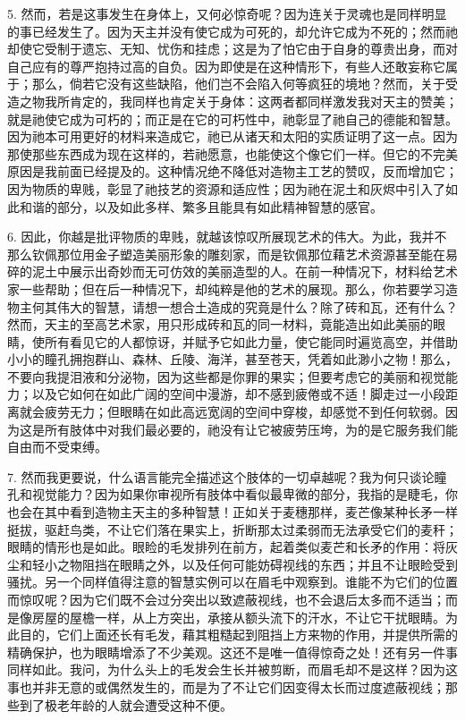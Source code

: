 5. 然而，若是这事发生在身体上，又何必惊奇呢？因为连关于灵魂也是同样明显的事已经发生了。因为天主并没有使它成为可死的，却允许它成为不死的；然而祂却使它受制于遗忘、无知、忧伤和挂虑；这是为了怕它由于自身的尊贵出身，而对自己应有的尊严抱持过高的自负。因为即使是在这种情形下，有些人还敢妄称它属于；那么，倘若它没有这些缺陷，他们岂不会陷入何等疯狂的境地？然而，关于受造之物我所肯定的，我同样也肯定关于身体：这两者都同样激发我对天主的赞美；就是祂使它成为可朽的；而正是在它的可朽性中，祂彰显了祂自己的德能和智慧。因为祂本可用更好的材料来造成它，祂已从诸天和太阳的实质证明了这一点。因为那使那些东西成为现在这样的，若祂愿意，也能使这个像它们一样。但它的不完美原因是我前面已经提及的。这种情况绝不降低对造物主工艺的赞叹，反而增加它；因为物质的卑贱，彰显了祂技艺的资源和适应性；因为祂在泥土和灰烬中引入了如此和谐的部分，以及如此多样、繁多且能具有如此精神智慧的感官。\par

6. 因此，你越是批评物质的卑贱，就越该惊叹所展现艺术的伟大。为此，我并不那么钦佩那位用金子塑造美丽形象的雕刻家，而是钦佩那位藉艺术资源甚至能在易碎的泥土中展示出奇妙而无可仿效的美丽造型的人。在前一种情况下，材料给艺术家一些帮助；但在后一种情况下，却纯粹是他的艺术的展现。那么，你若要学习造物主何其伟大的智慧，请想一想合土造成的究竟是什么？除了砖和瓦，还有什么？然而，天主的至高艺术家，用只形成砖和瓦的同一材料，竟能造出如此美丽的眼睛，使所有看见它的人都惊讶，并赋予它如此力量，使它能同时遍览高空，并借助小小的瞳孔拥抱群山、森林、丘陵、海洋，甚至苍天，凭着如此渺小之物！那么，不要向我提泪液和分泌物，因为这些都是你罪的果实；但要考虑它的美丽和视觉能力；以及它如何在如此广阔的空间中漫游，却不感到疲倦或不适！脚走过一小段距离就会疲劳无力；但眼睛在如此高远宽阔的空间中穿梭，却感觉不到任何软弱。因为这是所有肢体中对我们最必要的，祂没有让它被疲劳压垮，为的是它服务我们能自由而不受束缚。\par

7. 然而我更要说，什么语言能完全描述这个肢体的一切卓越呢？我为何只谈论瞳孔和视觉能力？因为如果你审视所有肢体中看似最卑微的部分，我指的是睫毛，你也会在其中看到造物主天主的多种智慧！正如关于麦穗那样，麦芒像某种长矛一样挺拔，驱赶鸟类，不让它们落在果实上，折断那太过柔弱而无法承受它们的麦秆；眼睛的情形也是如此。眼睑的毛发排列在前方，起着类似麦芒和长矛的作用：将灰尘和轻小之物阻挡在眼睛之外，以及任何可能妨碍视线的东西；并且不让眼睑受到骚扰。另一个同样值得注意的智慧实例可以在眉毛中观察到。谁能不为它们的位置而惊叹呢？因为它们既不会过分突出以致遮蔽视线，也不会退后太多而不适当；而是像房屋的屋檐一样，从上方突出，承接从额头流下的汗水，不让它干扰眼睛。为此目的，它们上面还长有毛发，藉其粗糙起到阻挡上方来物的作用，并提供所需的精确保护，也为眼睛增添了不少美观。这还不是唯一值得惊奇之处！还有另一件事同样如此。我问，为什么头上的毛发会生长并被剪断，而眉毛却不是这样？因为这事也并非无意的或偶然发生的，而是为了不让它们因变得太长而过度遮蔽视线；那些到了极老年龄的人就会遭受这种不便。\par

